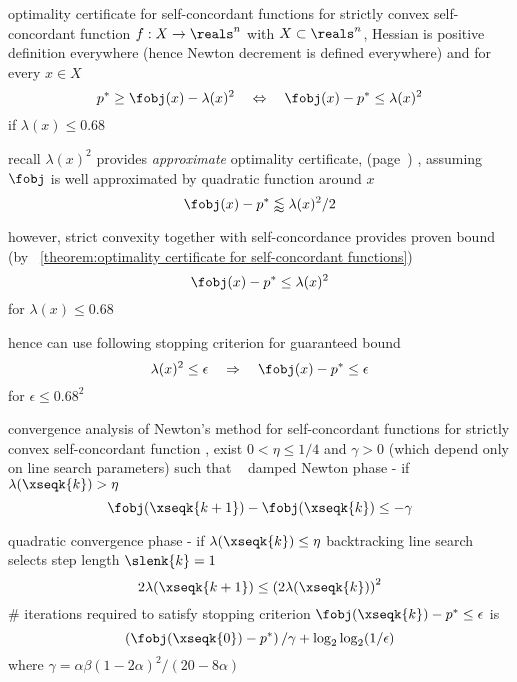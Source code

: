 \documentclass[17pt,landscape]{foils}
\begin{document}
{\begin{mytheorem}{optimality certificate for self-concordant functions}
	for strictly convex self-concordant function $f:X\to\reals^n$ with $X\subset \reals^n$,
	Hessian is positive definition everywhere (hence Newton decrement is defined everywhere)
	and for every $x\in X$
	$$
		p^\ast \geq \fobj(x) - \lambda(x)^2
		\quad
		\Leftrightarrow
		\quad
		\fobj(x) - p^\ast \leq \lambda(x)^2
	$$
	if $\lambda(x) \leq 0.68$
\end{mytheorem}
\vfill



\bit
\item
	recall $\lambda(x)^2$ provides \emph{approximate} optimality certificate,
	(page~\pageref{page:Newton decrement in quadratic approximation})
	\ie,
	assuming $\fobj$ is well approximated by quadratic function around $x$
	$$
		\fobj(x) - p^\ast \lessapprox \lambda(x)^2/2
	$$

\vitem
	however, strict convexity together with self-concordance
	provides proven bound
	(by \theoremname~\ref{theorem:optimality certificate for self-concordant functions})
	$$
		\fobj(x) - p^\ast \leq \lambda(x)^2
	$$
	for $\lambda(x) \leq 0.68$

\vitem
	hence can use following stopping criterion for guaranteed bound
	$$
		\lambda(x)^2 \leq \epsilon
		\quad
		\Rightarrow
		\quad
		\fobj(x) - p^\ast \leq \epsilon
	$$
	for $\epsilon \leq 0.68^2$
\eit
\vfill



\begin{mytheorem}{convergence analysis of Newton's method for self-concordant functions}
	for strictly convex self-concordant function \fobj,
	exist $0<\eta\leq 1/4$ and $\gamma>0$ (which depend only on line search parameters)
	such that
	\shrinkspacewithintheoremslike\
	\ibit
	\iitem
		damped Newton phase
		-
		if $\lambda(\xseqk{k})>\eta$
		$$
			\fobj(\xseqk{k+1}) - \fobj(\xseqk{k}) \leq - \gamma
		$$

	\iitem
		quadratic convergence phase
		-
		if $\lambda(\xseqk{k})\leq\eta$
		backtracking line search selects step length $\slenk{k}=1$
		$$
			2\lambda(\xseqk{k+1})
			\leq
			\left(2\lambda(\xseqk{k})\right)^2
		$$
	\eit
	\# iterations required to satisfy stopping criterion
	$\fobj(\xseqk{k})-p^\ast\leq\epsilon$ is
	$$
		\left(\fobj(\xseqk{0}) - p^\ast\right)/{\gamma}
		+ \log_2 \log_2 (1 / \epsilon)
	$$
	where $\gamma = \alpha \beta (1-2\alpha)^2 / (20-8\alpha)$
\end{mytheorem}
\vfill


}
\end{document}
